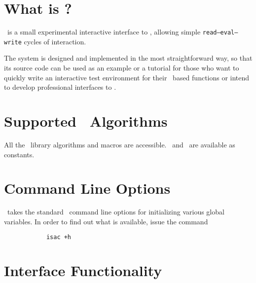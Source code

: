 \section{What is \isac?}

\isac\ is a small experimental interactive interface to \saclib, allowing
simple {\tt read--eval--write} cycles of interaction.

The system is designed and implemented in the most straightforward way, so
that its source code can be used as an example or a tutorial for those who
want to quickly write an interactive test environment for their \saclib\ based
functions or intend to develop professional interfaces to \saclib.


\section{Supported \saclib\ Algorithms}

All the \saclib\ library algorithms and macros are accessible.
\NIL\ and \BETA\ are available as constants.


\section{Command Line Options}

\isac\ takes the standard \saclib\ command line options for initializing
various global variables.  In order to find out what is available, issue the
command
\begin{verbatim}
            isac +h
\end{verbatim}


\section{Interface Functionality}

